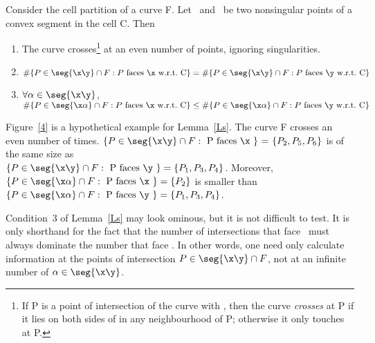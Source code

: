 \begin{lemma}
\label{Ls}
Consider the cell partition of a curve F.
Let \x\ and \y\ be two nonsingular points of a convex segment in the cell C.
Then
\begin{enumerate}
\item The curve crosses\footnote{If P is a point of intersection of the curve 
	with \seg{\x\y}, then the curve {\em crosses} \seg{\x\y} at P if it lies 
	on both sides of \seg{\x\y} in any neighbourhood of P; otherwise it 
	only touches \seg{\x\y} at P.}
\seg{\x\y} at an even number of points, ignoring singularities.
\item $\#\{P \in \seg{\x\y} \cap F: P \mbox{ faces \x\ w.r.t.\ C}\} = 
\#\{P \in \seg{\x\y} \cap F: P \mbox{ faces \y\ w.r.t.\ C}\}$
\item $\forall \alpha \in \seg{\x\y}$,\ \ \nopagebreak
$\#\{P \in\seg{\x\alpha}\cap F: P \mbox{ faces \x\ w.r.t.\ C}\} \leq 
\#\{P \in \seg{\x\alpha}\cap F: P \mbox{ faces \y\ w.r.t.\ C}\} $
\end{enumerate}
\end{lemma}
%
\begin{example}
Figure~\ref{4} is a hypothetical example for Lemma~\ref{Ls}.
The curve F crosses \seg{\x\y} an even number of times.
$\{ P \in \seg{\x\y} \cap F:\mbox{ P faces \x\ \} = \{}P_{2},P_{5},P_{6}\}$
is of the same size as \\
$\{ P \in \seg{\x\y} \cap F:\mbox{ P faces \y } \} = \{P_{1},P_{3},P_{4}\}$.
Moreover,
$\{ P \in \seg{\x\alpha} \cap F: \mbox{ P faces \x } \} = \{P_{2}\}$
is smaller than
$\{ P \in \seg{\x\alpha} \cap F: \mbox{ P faces \y } \} = \{P_{1},P_{3},P_{4}\}$.
\end{example}
%
%
Condition~3 of Lemma~\ref{Ls} may look ominous, but it is not difficult to test.  
It is only shorthand for the fact that
the number of intersections that face \y\ must always dominate the number that
face \x.  
In other words, one need only calculate information at the points
of intersection $P \in \seg{\x\y} \cap F$, not at an infinite number of 
$\alpha \in \seg{\x\y}$.
%

